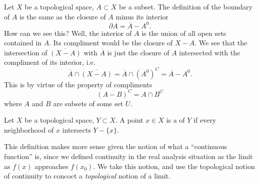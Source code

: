 \begin{rmk}
Let $X$ be a topological space, $A\subset X$ be a subset. The definition
of the boundary of $A$ is the same as the closure of $A$ minus its
interior
\begin{equation}
\partial A = \overline{A}-A^0.
\end{equation}
How can we see this? Well, the interior of $A$ is the union of all
open sets contained in $A$. Its compliment would be the closure of
$X-A$. We see that the intersection of $\overline{(X-A)}$ with
$\overline{A}$ is just the closure of $A$ intersected with the
compliment of its interior, i.e.
\begin{equation}
\overline{A}\cap\overline{(X-A)}=\overline{A}\cap\left(A^0\right)^C =
\overline{A}-A^0.
\end{equation}
This is by virtue of the property of compliments
\begin{equation}
(A-B)^C = A\cap B^C
\end{equation}
where $A$ and $B$ are subsets of some set $U$.
\end{rmk}

\begin{defn}
Let $X$ be a topological space, $Y\subset X$. A point $x\in X$ is 
a  of $Y$ if every neighborhood of $x$ intersects
$Y-\{x\}$.
\end{defn}
\begin{rmk}
This definition makes more sense given the notion of what a
``continuous function'' is, since we defined continuity in the
real analysis situation as the limit as $f(x)$ approaches
$f(x_0)$. We take this notion, and use the topological notion of
continuity to concoct a \emph{topological} notion of a limit.
\end{rmk}
